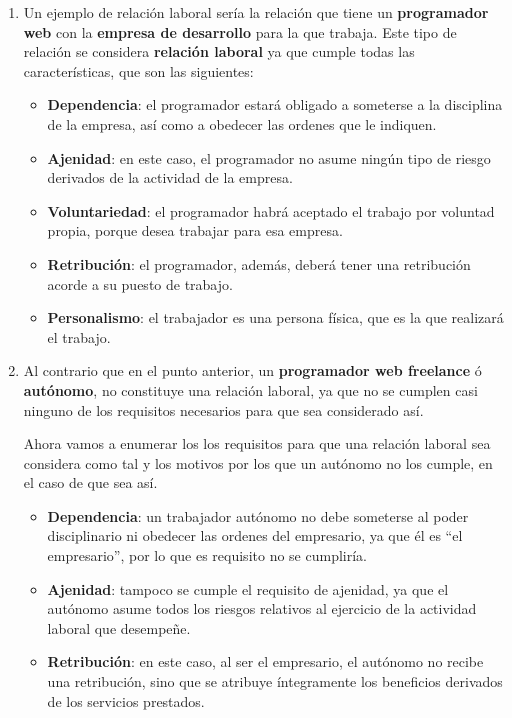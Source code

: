 \begin{enumerate}[label=(\alph*)]
    \item Un ejemplo de relación laboral sería la relación que tiene un \textbf{programador web} con la \textbf{empresa de desarrollo} para la que trabaja. Este tipo de relación se considera \textbf{relación laboral} ya que cumple todas las características, que son las siguientes:

    \begin{itemize}
        \item \textbf{Dependencia}: el programador estará obligado a someterse a la disciplina de la empresa, así como a obedecer las ordenes que le indiquen.
        \item \textbf{Ajenidad}: en este caso, el programador no asume ningún tipo de riesgo derivados de la actividad de la empresa.
        \item \textbf{Voluntariedad}: el programador habrá aceptado el trabajo por voluntad propia, porque desea trabajar para esa empresa.
        \item \textbf{Retribución}: el programador, además, deberá tener una retribución acorde a su puesto de trabajo.
        \item \textbf{Personalismo}: el trabajador es una persona física, que es la que realizará el trabajo.
    \end{itemize}


    \item Al contrario que en el punto anterior, un  \textbf{programador web freelance} ó \textbf{autónomo}, no constituye una relación laboral, ya que no se cumplen casi ninguno de los requisitos necesarios para que sea considerado así.

    Ahora vamos a enumerar los los requisitos para que una relación laboral sea considera como tal y los motivos por los que un autónomo no los cumple, en el caso de que sea así.

    \begin{itemize}
        \item \textbf{Dependencia}: un trabajador autónomo no debe someterse al poder disciplinario ni obedecer las ordenes del empresario, ya que él es ``el empresario'', por lo que es requisito no se cumpliría.
        \item \textbf{Ajenidad}: tampoco se cumple el requisito de ajenidad, ya que el autónomo asume todos los riesgos relativos al ejercicio de la actividad laboral que desempeñe.
        \item \textbf{Retribución}: en este caso, al ser el empresario, el autónomo no recibe una retribución, sino que se atribuye íntegramente los beneficios derivados de los servicios prestados.
    \end{itemize}


\end{enumerate}
